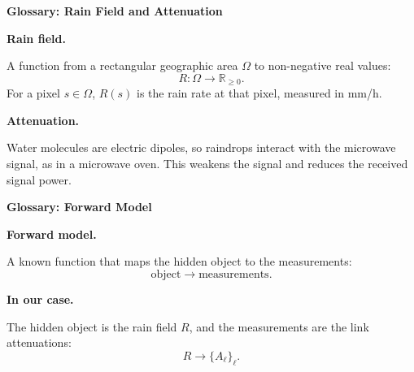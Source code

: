 
\begin{frame}[plain]
    \vspace{-0.5mm}
    \begin{center}\large\bfseries Glossary: Rain Field and Attenuation\end{center}
    \vspace{4mm}

    \vspace{3mm}
    \textbf{Rain field.}

    \vspace{1mm}
    A function from a rectangular geographic area $\Omega$ to non-negative real values:
    \[
        R:\Omega \to \mathbb{R}_{\ge 0}.
    \]
    For a pixel $s\in\Omega$, $R(s)$ is the rain rate at that pixel, measured in mm/h.

    \vspace{3mm}
    \textbf{Attenuation.}

    \vspace{1mm}
    Water molecules are electric dipoles, so raindrops interact with the microwave signal, as in a microwave oven. This weakens the signal and reduces the received signal power.
\end{frame}


\begin{frame}[plain]
    \vspace{-0.5mm}
    \begin{center}\large\bfseries Glossary: Forward Model\end{center}
    \vspace{4mm}

    \textbf{Forward model.}

    \vspace{1mm}
    A known function that maps the hidden object to the measurements:
    \[
        \text{object} \longrightarrow \text{measurements}.
    \]

    \vspace{3mm}
    \textbf{In our case.}

    \vspace{1mm}
    The hidden object is the rain field $R$, and the measurements are the link attenuations:
    \[
        R \longrightarrow \{A_\ell\}_\ell .
    \]

\end{frame}

